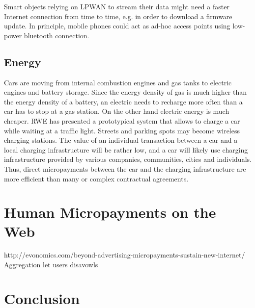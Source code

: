 Smart objects relying on LPWAN to stream their data might need a faster Internet connection from time to time, e.g. in order to download a firmware update. In principle, mobile phones could act as ad-hoc access points using low-power bluetooth connection. 

\subsection{Energy}

Cars are moving from internal combustion engines and gas tanks to electric engines and battery storage. Since the energy density of gas is much higher than the energy density of a battery, an electric needs to recharge more often than a car has to stop at a gas station. On the other hand electric energy is much cheaper. RWE has presented a prototypical system that allows to charge a car while waiting at a traffic light. Streets and parking spots may become wireless charging stations. The value of an individual transaction between a car and a local charging infrastructure will be rather low, and a car will likely use charging infrastructure provided by various companies, communities, cities and individuals. Thus, direct micropayments between the car and the charging infrastructure are more efficient than many or complex contractual agreements.

\section{Human Micropayments on the Web}

http://evonomics.com/beyond-advertising-micropayments-sustain-new-internet/
Aggregation let users disavowls


\section{Conclusion}








